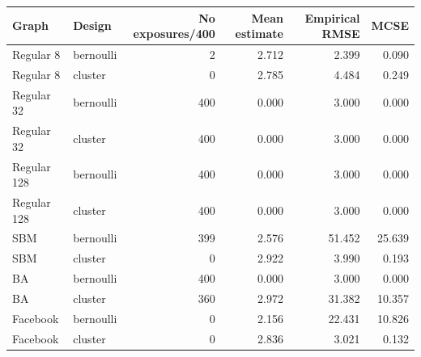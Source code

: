 \begin{tabular}{llrrrr}
\toprule
Graph & Design & No exposures/400 & Mean estimate & Empirical RMSE & MCSE \\
\midrule
Regular 8 & bernoulli & 2 & 2.712 & 2.399 & 0.090 \\
Regular 8 & cluster & 0 & 2.785 & 4.484 & 0.249 \\
Regular 32 & bernoulli & 400 & 0.000 & 3.000 & 0.000 \\
Regular 32 & cluster & 400 & 0.000 & 3.000 & 0.000 \\
Regular 128 & bernoulli & 400 & 0.000 & 3.000 & 0.000 \\
Regular 128 & cluster & 400 & 0.000 & 3.000 & 0.000 \\
SBM & bernoulli & 399 & 2.576 & 51.452 & 25.639 \\
SBM & cluster & 0 & 2.922 & 3.990 & 0.193 \\
BA & bernoulli & 400 & 0.000 & 3.000 & 0.000 \\
BA & cluster & 360 & 2.972 & 31.382 & 10.357 \\
Facebook & bernoulli & 0 & 2.156 & 22.431 & 10.826 \\
Facebook & cluster & 0 & 2.836 & 3.021 & 0.132 \\
\bottomrule
\end{tabular}